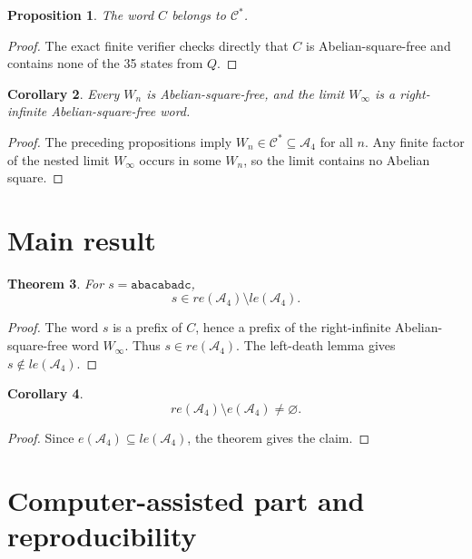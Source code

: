 \documentclass[11pt]{article}
\newtheorem{theorem}{Theorem}[section]
\newtheorem{proposition}[theorem]{Proposition}
\newtheorem{corollary}[theorem]{Corollary}
\theoremstyle{definition}
\newcommand{\A}{\mathcal A_4}
\newcommand{\code}[1]{\texttt{#1}}
\begin{document}
\begin{proposition}
The word $C$ belongs to $\mathcal C^*$.
\end{proposition}

\begin{proof}
The exact finite verifier checks directly that $C$ is Abelian-square-free and contains none of the 35 states from $Q$.
\end{proof}

\begin{corollary}
Every $W_n$ is Abelian-square-free, and the limit $W_\infty$ is a right-infinite Abelian-square-free word.
\end{corollary}

\begin{proof}
The preceding propositions imply $W_n\in\mathcal C^*\subseteq\A$ for all $n$. Any finite factor of the nested limit $W_\infty$ occurs in some $W_n$, so the limit contains no Abelian square.
\end{proof}

\section{Main result}

\begin{theorem}
For $s=\code{abacabadc}$,
\[
\boxed{s\in re(\A)\setminus le(\A)}.
\]
\end{theorem}

\begin{proof}
The word $s$ is a prefix of $C$, hence a prefix of the right-infinite Abelian-square-free word $W_\infty$. Thus $s\in re(\A)$. The left-death lemma gives $s\notin le(\A)$.
\end{proof}

\begin{corollary}
\[
re(\A)\setminus e(\A)\ne\varnothing.
\]
\end{corollary}

\begin{proof}
Since $e(\A)\subseteq le(\A)$, the theorem gives the claim.
\end{proof}

\section{Computer-assisted part and reproducibility}
\end{document}

